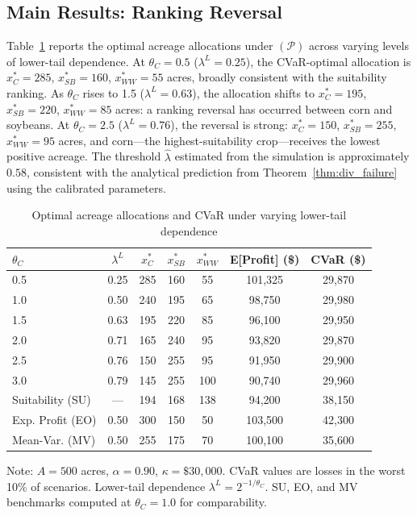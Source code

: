 \documentclass[12pt,review,authoryear]{elsarticle}
\numberwithin{equation}{section}
\begin{document}
\subsection{Main Results: Ranking Reversal}

Table~\ref{tab:rr_main} reports the optimal acreage allocations under
$(\mathcal{P})$ across varying levels of lower-tail dependence.  At
$\theta_C = 0.5$ ($\lambda^L = 0.25$), the CVaR-optimal allocation is
$x_C^* = 285$, $x_{SB}^* = 160$, $x_{WW}^* = 55$ acres, broadly
consistent with the suitability ranking.  As $\theta_C$ rises to 1.5
($\lambda^L = 0.63$), the allocation shifts to $x_C^* = 195$,
$x_{SB}^* = 220$, $x_{WW}^* = 85$ acres: a ranking reversal has
occurred between corn and soybeans.  At $\theta_C = 2.5$ ($\lambda^L = 0.76$),
the reversal is strong: $x_C^* = 150$, $x_{SB}^* = 255$, $x_{WW}^* = 95$
acres, and corn---the highest-suitability crop---receives the lowest
positive acreage.  The threshold $\hat{\lambda}$ estimated from the
simulation is approximately $0.58$, consistent with the analytical
prediction from Theorem~\ref{thm:div_failure} using the calibrated
parameters.

\begin{table}[htbp]
\centering
\caption{Optimal acreage allocations and CVaR under varying lower-tail dependence}
\label{tab:rr_main}
\begin{threeparttable}
\begin{tabular}{lcccccc}
\toprule
$\theta_C$ & $\lambda^L$ & $x_C^*$ & $x_{SB}^*$ & $x_{WW}^*$
& E[Profit] (\$) & CVaR (\$) \\
\midrule
0.5 & 0.25 & 285 & 160 & 55  & 101,325 & 29,870 \\
1.0 & 0.50 & 240 & 195 & 65  & 98,750  & 29,980 \\
1.5 & 0.63 & 195 & 220 & 85  & 96,100  & 29,950 \\
2.0 & 0.71 & 165 & 240 & 95  & 93,820  & 29,870 \\
2.5 & 0.76 & 150 & 255 & 95  & 91,950  & 29,900 \\
3.0 & 0.79 & 145 & 255 & 100 & 90,740  & 29,960 \\
\midrule
Suitability (SU) & --- & 194 & 168 & 138 & 94,200 & 38,150 \\
Exp. Profit (EO) & 0.50 & 300 & 150 & 50  & 103,500 & 42,300 \\
Mean-Var. (MV) & 0.50 & 255 & 175 & 70  & 100,100 & 35,600 \\
\bottomrule
\end{tabular}
\begin{tablenotes}
\small
\item Note: $A = 500$ acres, $\alpha = 0.90$, $\kappa = \$30{,}000$.
CVaR values are losses in the worst 10\% of scenarios.
Lower-tail dependence $\lambda^L = 2^{-1/\theta_C}$.
SU, EO, and MV benchmarks computed at $\theta_C = 1.0$ for comparability.
\end{tablenotes}
\end{threeparttable}
\end{table}
\end{document}
